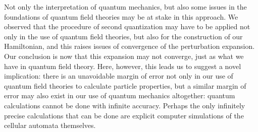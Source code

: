 \documentclass[main.tex]{subfiles}
\begin{document}
Not only the interpretation of quantum mechanics, but also some issues in the foundations of quantum field theories may be at stake in this approach. We observed that the procedure of second quantization may have to be applied not only in the use of quantum field theories, but also for the construction of our Hamiltonian, and this raises issues of convergence of the perturbation expansion. Our conclusion is now that this expansion may not converge, just as what we have in quantum field theory. Here, however, this leads us to suggest a novel implication: there is an unavoidable margin of error not only in our use of quantum field theories to calculate particle properties, but a similar margin of error may also exist in our use of quantum mechanics altogether: quantum calculations cannot be done with infinite accuracy. Perhaps the only infinitely precise calculations that can be done are explicit computer
simulations of the cellular automata themselves.





\begin{equation}\label{23.}
	
\end{equation}
\end{document}
